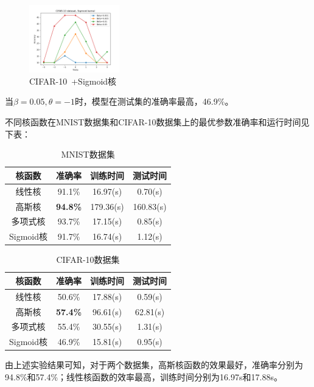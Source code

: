 \documentclass[a4paper]{article}
\begin{document}
\begin{figure}[H]
    \centering
    \includegraphics[width=0.35\textwidth]{pictures/single kernel/参数消融+CIFAR10+sigmoid核.png}
    \caption{CIFAR-10\ +Sigmoid核}
\end{figure}
当$\beta=0.05, \theta=-1$时，模型在测试集的准确率最高，46.9\%。


不同核函数在MNIST数据集和CIFAR-10数据集上的最优参数准确率和运行时间见下表：
\begin{table}[H]
  \caption{MNIST数据集}
  \centering
  \begin{tabular}{ c c c c }
    \toprule
    \textbf{核函数} & \textbf{准确率} & \textbf{训练时间} & \textbf{测试时间}\\
    \midrule
    线性核 & 91.1\% & 16.97(s) & 0.70(s) \\
    高斯核 & \textbf{94.8\%} & 179.36(s) & 160.83(s) \\
    多项式核 & 93.7\% & 17.15(s) & 0.85(s) \\
    Sigmoid核 & 91.7\% & 16.74(s) & 1.12(s) \\
    \bottomrule
  \end{tabular}
\end{table}

\begin{table}[H]
  \caption{CIFAR-10数据集}
  \centering
  \begin{tabular}{ c c c c }
    \toprule
    \textbf{核函数} & \textbf{准确率} & \textbf{训练时间} & \textbf{测试时间}\\
    \midrule
    线性核 & 50.6\% & 17.88(s) & 0.59(s) \\
    高斯核 & \textbf{57.4\%} & 96.61(s) & 62.81(s) \\
    多项式核 & 55.4\% & 30.55(s) & 1.31(s) \\
    Sigmoid核 & 46.9\% & 15.81(s) & 0.95(s) \\
    \bottomrule
  \end{tabular}
\end{table}

由上述实验结果可知，对于两个数据集，高斯核函数的效果最好，准确率分别为94.8\%和57.4\%；线性核函数的效率最高，训练时间分别为16.97s和17.88s。
\end{document}
